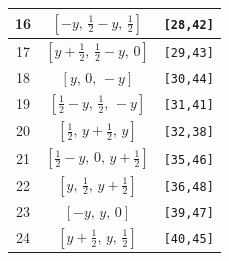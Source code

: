 \documentclass[fleqn,8pt]{jsarticle}
\begin{document}
\begin{longtable}{ccc}
16 & $\left[ - y,\, \frac{1}{2} - y,\, \frac{1}{2} \right]$ & {\tt [28,42]} \\ \hline
17 & $\left[ y + \frac{1}{2},\, \frac{1}{2} - y,\, 0 \right]$ & {\tt [29,43]} \\ \hline
18 & $\left[ y,\, 0,\, - y \right]$ & {\tt [30,44]} \\ \hline
19 & $\left[ \frac{1}{2} - y,\, \frac{1}{2},\, - y \right]$ & {\tt [31,41]} \\ \hline
20 & $\left[ \frac{1}{2},\, y + \frac{1}{2},\, y \right]$ & {\tt [32,38]} \\ \hline
21 & $\left[ \frac{1}{2} - y,\, 0,\, y + \frac{1}{2} \right]$ & {\tt [35,46]} \\ \hline
22 & $\left[ y,\, \frac{1}{2},\, y + \frac{1}{2} \right]$ & {\tt [36,48]} \\ \hline
23 & $\left[ - y,\, y,\, 0 \right]$ & {\tt [39,47]} \\ \hline
24 & $\left[ y + \frac{1}{2},\, y,\, \frac{1}{2} \right]$ & {\tt [40,45]} \\
\end{longtable}
\renewcommand{\arraystretch}{1.2}
\end{document}
